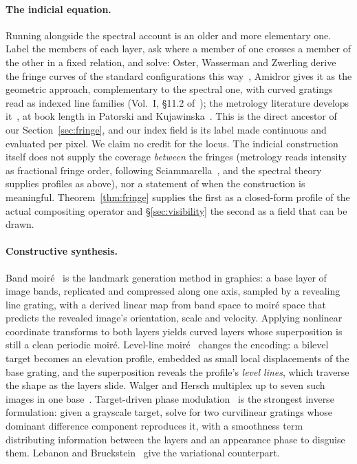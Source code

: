 \paragraph{The indicial equation.}
Running alongside the spectral account is an older and more elementary one. Label
the members of each layer, ask where a member of one crosses a member of the other
in a fixed relation, and solve: Oster, Wasserman and Zwerling derive the fringe
curves of the standard configurations this way~\cite{Oster1964}, Amidror gives
it as the geometric approach, complementary to the spectral one, with curved
gratings read as indexed line families (Vol.~I, \S11.2
of~\cite{Amidror2009Theory}); the metrology literature develops
it~\cite{Bryngdahl1974Moire}, at book length in Patorski and
Kujawinska~\cite{Patorski1993Handbook}. This is the direct ancestor of our
Section~\ref{sec:fringe}, and our index field is its label made continuous and
evaluated per pixel. We claim no credit for the locus. The indicial
construction itself does not supply the coverage \emph{between} the fringes
(metrology reads intensity as fractional fringe order, following
Sciammarella~\cite{Sciammarella1965Basic}, and the spectral theory supplies
profiles as above), nor a statement of when the construction is meaningful.
Theorem~\ref{thm:fringe} supplies the first as a closed-form profile of the
actual compositing operator and \S\ref{sec:visibility} the second as a field
that can be drawn.

\paragraph{Constructive synthesis.}
Band moir\'e~\cite{Hersch2004Band} is the landmark generation method in graphics:
a base layer of image bands, replicated and compressed along one axis, sampled by a
revealing line grating, with a derived linear map from band space to moir\'e space
that predicts the revealed image's orientation, scale and velocity. Applying
nonlinear coordinate transforms to both layers yields curved layers whose
superposition is still a clean periodic moir\'e. Level-line
moir\'e~\cite{Chosson2014Beating} changes the encoding: a bilevel target becomes an
elevation profile, embedded as small local displacements of the base grating, and
the superposition reveals the profile's \emph{level lines}, which traverse the
shape as the layers slide. Walger and Hersch multiplex up to seven such images in
one base~\cite{Walger2015Hiding}. Target-driven phase
modulation~\cite{Tsai2013Target} is the strongest inverse formulation: given a
grayscale target, solve for two curvilinear gratings whose dominant difference
component reproduces it, with a smoothness term distributing information between
the layers and an appearance phase to disguise them. Lebanon and
Bruckstein~\cite{Lebanon2001Variational} give the variational counterpart.

